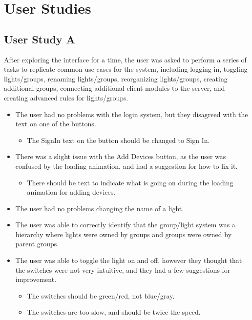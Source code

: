 \documentclass[10pt,draftclsnofoot,onecolumn]{IEEEtran}
\begin{document}
\section{User Studies}

\subsection{User Study A}

After exploring the interface for a time, the user was asked to perform a
series of tasks to replicate common use cases for the system, including logging
in, toggling lights/groups, renaming lights/groups, reorganizing lights/groups,
creating additional groups, connecting additional client modules to the server,
and creating advanced rules for lights/groups.

\begin{itemize}
    \item The user had no problems with the login system, but they disagreed
        with the text on one of the buttons.
        \begin{itemize}
            \item The SignIn text on the button should be changed to Sign In.
        \end{itemize}
    \item There was a slight issue with the Add Devices button, as the user was
        confused by the loading animation, and had a suggestion for how to fix
        it.
        \begin{itemize}
            \item There should be text to indicate what is going on during the
                loading animation for adding devices.
        \end{itemize}
    \item The user had no problems changing the name of a light.
    \item The user was able to correctly identify that the group/light system
        was a hierarchy where lights were owned by groups and groups were owned
        by parent groups.
    \item The user was able to toggle the light on and off, however they
        thought that the switches were not very intuitive, and they had a few
        suggestions for improvement.
        \begin{itemize}
            \item The switches should be green/red, not blue/gray.
            \item The switches are too slow, and should be twice the speed.

\end{itemize}
\end{itemize}
\end{document}
